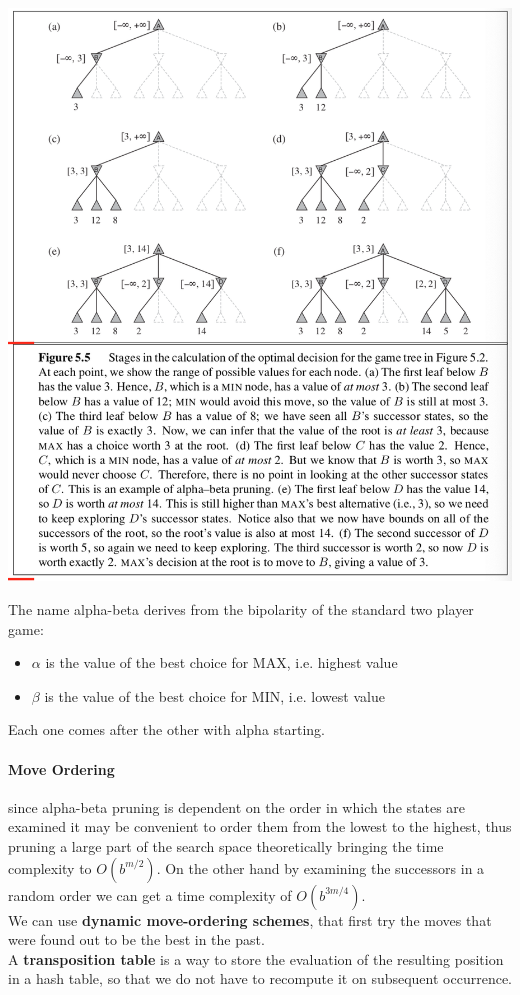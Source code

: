 \documentclass[10pt,a4paper]{article}
\begin{document}
\includegraphics[scale=0.5]{images/alpha_beta_ex.png}

The name alpha-beta derives from the bipolarity of the standard two player game:
\begin{itemize}
\item $\alpha$ is the value of the best choice for MAX, i.e. highest value
\item $\beta$ is the value of the best choice for MIN, i.e. lowest value
\end{itemize}
Each one comes after the other with alpha starting.

\paragraph{Move Ordering} since alpha-beta pruning is dependent on the order in which the states are examined it may be convenient to order them from the lowest to the highest, thus pruning a large part of the search space theoretically bringing the time complexity to $O(b^{m/2})$. On the other hand by examining the successors in a random order we can get a time complexity of $O(b^{3m/4})$.\\
We can use \textbf{dynamic move-ordering schemes}, that first try the moves that were found out to be the best in the past.\\
A \textbf{transposition table} is a way to store the evaluation of the resulting position in a hash table, so that we do not have to recompute it on subsequent occurrence.
\end{document}
